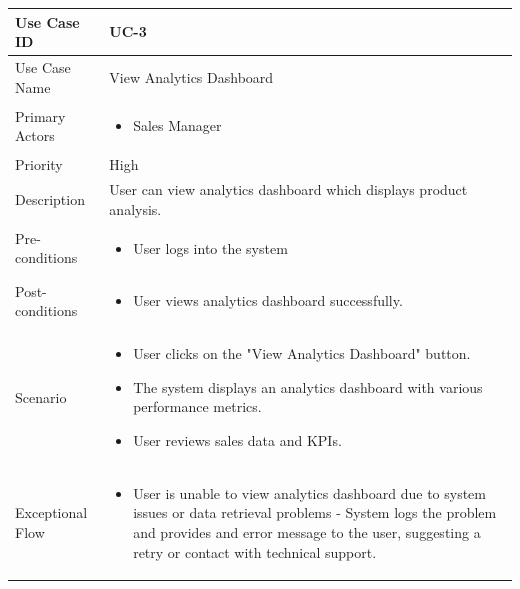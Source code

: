 \vspace{12pt}

\begin{tabularx}{\textwidth}{|l|X|}
\hline
Use Case ID & UC-3 \\
\hline
Use Case Name & View Analytics Dashboard\\
\hline
Primary Actors & 
\begin{itemize}
    \item Sales Manager
\end{itemize} \\
\hline
Priority & High \\
\hline
Description & User can view analytics dashboard which displays product analysis. \\
\hline
Pre-conditions & 
\begin{itemize}
    \item User logs into the system
\end{itemize} \\
\hline
Post-conditions & 
\begin{itemize}
    \item User views analytics dashboard successfully.
\end{itemize} \\
\hline
Scenario & 
\begin{itemize}
    \item User clicks on the "View Analytics Dashboard" button. 
    \item The system displays an analytics dashboard with various performance metrics.
    \item User reviews sales data and KPIs.
\end{itemize}\\
\hline
Exceptional Flow & 
\begin{itemize}
    \item User is unable to view analytics dashboard due to system issues or data retrieval problems - System logs the problem and provides and error message to the user, suggesting a retry or contact with technical support.
\end{itemize}\\
\hline
\end{tabularx}

\vspace{12pt}

